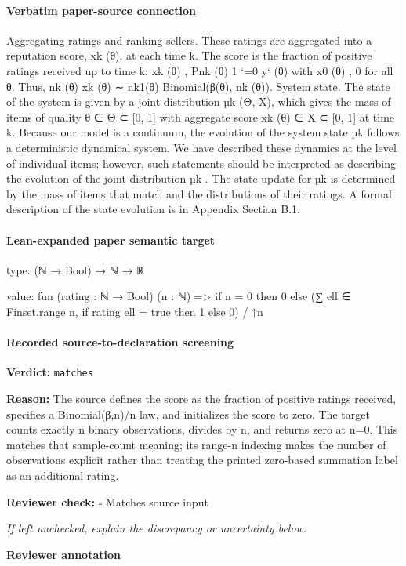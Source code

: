 \documentclass[10pt]{article}
\newcommand{\reviewerbox}{%
  \par\noindent\fbox{\parbox{0.96\linewidth}{\rule{0pt}{0.38in}}}\par
}
\newcommand{\reviewmatch}[1]{%
  \par\noindent\textbf{Reviewer check:} $\square$\; #1\par
  \noindent\emph{If left unchecked, explain the discrepancy or uncertainty below.}\par
}
\begin{document}
\paragraph{Verbatim paper-source connection}
\begin{ReviewVerbatim}
Aggregating ratings and ranking sellers.
These ratings are aggregated into a reputation score,
xk (θ), at each time k. The score is the fraction
of positive ratings received up to time k: xk (θ) ,
Pnk (θ)
1
`=0 y` (θ) with x0 (θ) , 0 for all θ. Thus,
nk (θ)
xk (θ) ∼ nk1(θ) Binomial(β(θ), nk (θ)).
System state. The state of the system is given by a
joint distribution µk (Θ, X), which gives the mass of
items of quality θ ∈ Θ ⊂ [0, 1] with aggregate score
xk (θ) ∈ X ⊂ [0, 1] at time k. Because our model is
a continuum, the evolution of the system state µk
follows a deterministic dynamical system.
We have described these dynamics at the level of individual items; however, such statements should be
interpreted as describing the evolution of the joint
distribution µk . The state update for µk is determined by the mass of items that match and the distributions of their ratings. A formal description of
the state evolution is in Appendix Section B.1.
\end{ReviewVerbatim}



\paragraph{Lean-expanded paper semantic target}
\begin{ReviewVerbatim}
type:
(ℕ → Bool) → ℕ → ℝ

value:
fun (rating : ℕ → Bool) (n : ℕ) => if n = 0 then 0 else (∑ ell ∈ Finset.range n, if rating ell = true then 1 else 0) / ↑n
\end{ReviewVerbatim}


\paragraph{Recorded source-to-declaration screening}
\textbf{Verdict:} \texttt{matches}
\\
{\raggedright
\textbf{Reason:} The source defines the score as the fraction of positive ratings received, specifies a Binomial(β,n)/\allowbreak{}n law, and initializes the score to zero.\allowbreak{} The target counts exactly n binary observations, divides by n, and returns zero at n=0.\allowbreak{} This matches that sample-\allowbreak{}count meaning;\allowbreak{} its range-\allowbreak{}n indexing makes the number of observations explicit rather than treating the printed zero-\allowbreak{}based summation label as an additional rating.\allowbreak{}
\par}
\reviewmatch{Matches source input}
\noindent\textbf{Reviewer annotation}\par
\reviewerbox
\clearpage
\hypertarget{paper-prerequisite-bb12d1c548870615}{}
\end{document}

